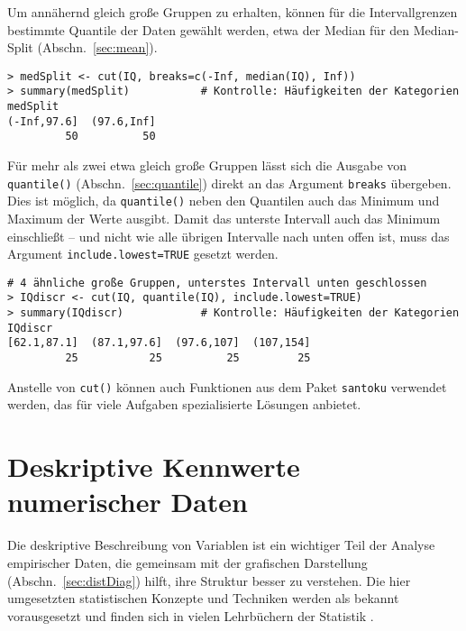 Um annähernd gleich große Gruppen zu erhalten, können für die Intervallgrenzen bestimmte Quantile der Daten gewählt werden, etwa der Median für den Median-Split (Abschn.\ \ref{sec:mean}).
\begin{lstlisting}
> medSplit <- cut(IQ, breaks=c(-Inf, median(IQ), Inf))
> summary(medSplit)           # Kontrolle: Häufigkeiten der Kategorien
medSplit
(-Inf,97.6]  (97.6,Inf]
         50          50
\end{lstlisting}

Für mehr als zwei etwa gleich große Gruppen lässt sich die Ausgabe von \lstinline!quantile()! (Abschn.\ \ref{sec:quantile}) direkt an das Argument \lstinline!breaks! übergeben. Dies ist möglich, da \lstinline!quantile()! neben den Quantilen auch das Minimum und Maximum der Werte ausgibt. Damit das unterste Intervall auch das Minimum einschließt -- und nicht wie alle übrigen Intervalle nach unten offen ist, muss das Argument \lstinline!include.lowest=TRUE! gesetzt werden.
\begin{lstlisting}
# 4 ähnliche große Gruppen, unterstes Intervall unten geschlossen
> IQdiscr <- cut(IQ, quantile(IQ), include.lowest=TRUE)
> summary(IQdiscr)            # Kontrolle: Häufigkeiten der Kategorien
IQdiscr
[62.1,87.1]  (87.1,97.6]  (97.6,107]  (107,154]
         25           25          25         25
\end{lstlisting}

Anstelle von \lstinline!cut()! können auch Funktionen aus dem Paket \lstinline!santoku! \cite{HughJones2024} verwendet werden, das für viele Aufgaben spezialisierte Lösungen anbietet.

\section{Deskriptive Kennwerte numerischer Daten}
\label{sec:descriptive}

Die deskriptive Beschreibung von Variablen ist ein wichtiger Teil der Analyse empirischer Daten, die gemeinsam mit der grafischen Darstellung (Abschn.\ \ref{sec:distDiag}) hilft, ihre Struktur besser zu verstehen. Die hier umgesetzten statistischen Konzepte und Techniken werden als bekannt vorausgesetzt und finden sich in vielen Lehrbüchern der Statistik \cite{Eid2010}.

